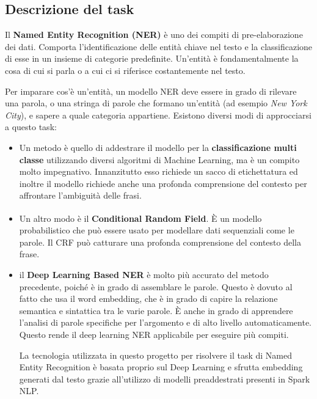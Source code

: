 \subsection{Descrizione del task}
Il \textbf{Named Entity Recognition (NER)} è uno dei compiti di pre-elaborazione dei dati. Comporta l'identificazione delle entità chiave nel testo e la classificazione di esse in un insieme di categorie predefinite. Un'entità è fondamentalmente la cosa di cui si parla o a cui ci si riferisce costantemente nel testo.

Per imparare cos'è un'entità, un modello NER deve essere in grado di rilevare una parola, o una stringa di parole che formano un'entità (ad esempio \textit{New York City}), e sapere a quale categoria appartiene. Esistono diversi modi di approcciarsi a questo task:
\begin{itemize}
    \item Un metodo è quello di addestrare il modello per la \textbf{classificazione multi classe} utilizzando diversi algoritmi di Machine Learning, ma è un compito molto impegnativo. Innanzitutto esso richiede un sacco di etichettatura ed inoltre il modello richiede anche una profonda comprensione del contesto per affrontare l'ambiguità delle frasi. 
    \item Un altro modo è il \textbf{Conditional Random Field}\textsuperscript{\cite{ravishchawla_crf}}. È un modello probabilistico che può essere usato per modellare dati sequenziali come le parole. Il CRF può catturare una profonda comprensione del contesto della frase.
    \item il \textbf{Deep Learning Based NER} è molto più accurato del metodo precedente, poiché è in grado di assemblare le parole. Questo è dovuto al fatto che usa il word embedding, che è in grado di capire la relazione semantica e sintattica tra le varie parole. È anche in grado di apprendere l'analisi di parole specifiche per l'argomento e di alto livello automaticamente. Questo rende il deep learning NER applicabile per eseguire più compiti. 
    
    La tecnologia utilizzata in questo progetto per risolvere il task di Named Entity Recognition è basata proprio sul Deep Learning e sfrutta embedding generati dal testo grazie all'utilizzo di modelli preaddestrati presenti in Spark NLP. 
\end{itemize}

